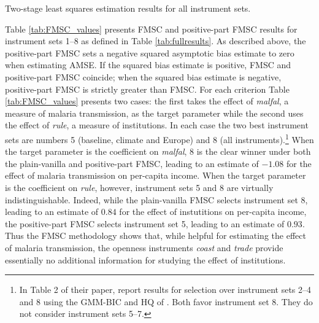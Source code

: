 \begin{table}[h]
\centering

\caption{Two-stage least squares estimation results for all instrument sets.}
\label{tab:fullresults}

\end{table}

Table \ref{tab:FMSC_values} presents FMSC and positive-part FMSC results for instrument sets 1--8  as defined in Table \ref{tab:fullresults}. 
As described above, the positive-part FMSC sets a negative squared asymptotic bias estimate to zero when estimating AMSE.
If the squared bias estimate is positive, FMSC and positive-part FMSC coincide; when the squared bias estimate is negative, positive-part FMSC is strictly greater than FMSC. 
For each criterion Table \ref{tab:FMSC_values} presents two cases: the first takes the effect of \emph{malfal}, a measure of malaria transmission, as the target parameter while the second uses the effect of \emph{rule}, a measure of institutions. 
In each case the two best instrument sets are numbers 5 (baseline, climate and Europe) and 8 (all instruments).\footnote{In Table 2 of their paper, \cite{Carstensen2006} report results for selection over instrument sets 2--4 and 8 using the GMM-BIC and HQ of \cite{Andrews1999}. Both favor instrument set 8. They do not consider instrument sets 5--7.}
When the target parameter is the coefficient on \emph{malfal}, 8 is the clear winner under both the plain-vanilla and positive-part FMSC, leading to an estimate of $-1.08$ for the effect of malaria transmission on per-capita income.
When the target parameter is the coefficient on \emph{rule}, however, instrument sets 5 and 8 are virtually indistinguishable.
Indeed, while the plain-vanilla FMSC selects instrument set 8, leading to an estimate of $0.84$ for the effect of instutitions on per-capita income, the positive-part FMSC selects instrument set 5, leading to an estimate of $0.93$. 
Thus the FMSC methodology shows that, while helpful for estimating the effect of malaria transmission, the openness instruments \emph{coast} and \emph{trade} provide essentially no additional information for studying the effect of institutions.

